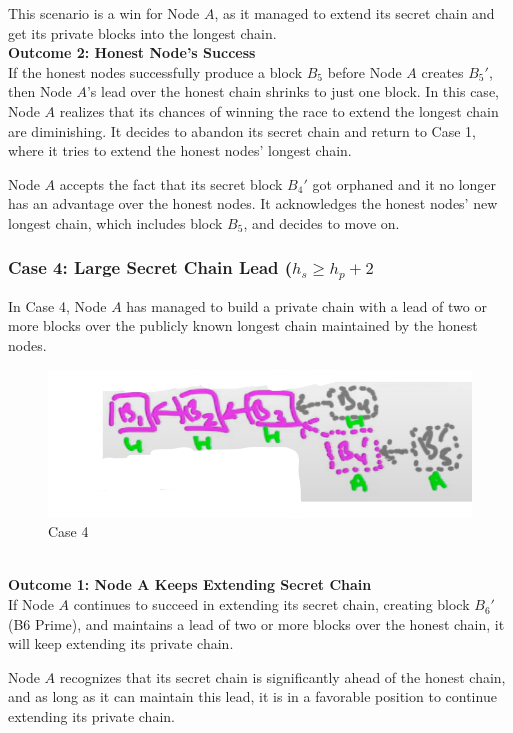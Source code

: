 This scenario is a win for Node $A$, as it managed to extend its secret chain and get its private blocks into the longest chain.\\

\noindent
\textbf{Outcome 2: Honest Node's Success}\\
If the honest nodes successfully produce a block $B_{5}$ before Node $A$ creates $B_{5}'$, then Node $A$'s lead over the honest chain shrinks to just one block. In this case, Node $A$ realizes that its chances of winning the race to extend the longest chain are diminishing. It decides to abandon its secret chain and return to Case 1, where it tries to extend the honest nodes' longest chain.

Node $A$ accepts the fact that its secret block $B_{4}'$ got orphaned and it no longer has an advantage over the honest nodes. It acknowledges the honest nodes' new longest chain, which includes block $B_{5}$, and decides to move on.

\subsubsection{Case 4: Large Secret Chain Lead ($h_s \geq h_p +2$}
In Case 4, Node $A$ has managed to build a private chain with a lead of two or more blocks over the publicly known longest chain maintained by the honest nodes.\\
\begin{figure}[h]
    \centering
    \includegraphics[scale = 0.5]{figures/f45.png}
    \caption{Case 4}
    \label{fig:mesh1}
\end{figure}\\
\noindent
\textbf{Outcome 1: Node A Keeps Extending Secret Chain}\\
If Node $A$ continues to succeed in extending its secret chain, creating block $B_{6}'$ (B6 Prime), and maintains a lead of two or more blocks over the honest chain, it will keep extending its private chain.

Node $A$ recognizes that its secret chain is significantly ahead of the honest chain, and as long as it can maintain this lead, it is in a favorable position to continue extending its private chain.\\

